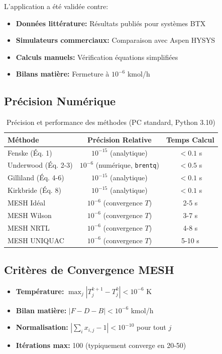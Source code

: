 \documentclass[11pt,a4paper]{article}
\newcommand{\code}[1]{\texttt{#1}}
\begin{document}
L'application a été validée contre:

\begin{itemize}[leftmargin=*]
    \item \textbf{Données littérature:} Résultats publiés pour systèmes BTX
    \item \textbf{Simulateurs commerciaux:} Comparaison avec Aspen HYSYS
    \item \textbf{Calculs manuels:} Vérification équations simplifiées
    \item \textbf{Bilans matière:} Fermeture à $10^{-6}$ kmol/h
\end{itemize}

\subsection{Précision Numérique}

\begin{table}[h]
\centering
\begin{tabular}{lcc}
\toprule
\textbf{Méthode} & \textbf{Précision Relative} & \textbf{Temps Calcul} \\
\midrule
Fenske (Éq. 1) & $10^{-15}$ (analytique) & $< 0.1$ s \\
Underwood (Éq. 2-3) & $10^{-6}$ (numérique, \code{brentq}) & $< 0.5$ s \\
Gilliland (Éq. 4-6) & $10^{-15}$ (analytique) & $< 0.1$ s \\
Kirkbride (Éq. 8) & $10^{-15}$ (analytique) & $< 0.1$ s \\
MESH Idéal & $10^{-6}$ (convergence $T$) & 2-5 s \\
MESH Wilson & $10^{-6}$ (convergence $T$) & 3-7 s \\
MESH NRTL & $10^{-6}$ (convergence $T$) & 4-8 s \\
MESH UNIQUAC & $10^{-6}$ (convergence $T$) & 5-10 s \\
\bottomrule
\end{tabular}
\caption{Précision et performance des méthodes (PC standard, Python 3.10)}
\end{table}

\subsection{Critères de Convergence MESH}

\begin{itemize}[leftmargin=*]
    \item \textbf{Température:} $\max_j |T_j^{k+1} - T_j^k| < 10^{-6}$ K
    \item \textbf{Bilan matière:} $|F - D - B| < 10^{-6}$ kmol/h
    \item \textbf{Normalisation:} $|\sum_i x_{i,j} - 1| < 10^{-10}$ pour tout $j$
    \item \textbf{Itérations max:} 100 (typiquement converge en 20-50)
\end{itemize}
\end{document}
